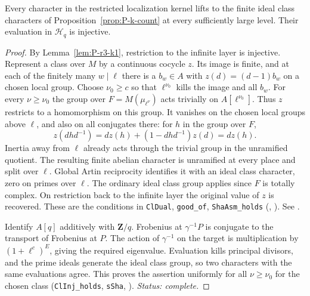 \begin{lemma}\label{lem:P-r3-k6}
Every character in the restricted localization kernel lifts to the
finite ideal class characters of Proposition~\ref{prop:P-k-count}
at every sufficiently large level. Their evaluation in $\mathcal H_q$
is injective.
\end{lemma}
\begin{proof}
By Lemma~\ref{lem:P-r3-k1}, restriction to the infinite layer is
injective. Represent a class over $M$ by a continuous cocycle $z$.
Its image is finite, and at each of the finitely many $w\mid\ell$
there is a $b_w\in A$ with $z(d)=(d-1)b_w$ on a chosen local group.
Choose $\nu_0\ge c$ so that $\ell^{\nu_0}$ kills the image and all
$b_w$. For every $\nu\ge\nu_0$ the group over $F=M(\mu_{\ell^\nu})$
acts trivially on $A[\ell^{\nu_0}]$. Thus $z$ restricts to a homomorphism
on this group. It vanishes on the chosen local groups above $\ell$,
and also on all conjugates there: for $h$ in the group over $F$,
\[
 z(dhd^{-1})=d z(h)+(1-dhd^{-1})z(d)=d z(h).
\]
Inertia away from $\ell$ already acts through the trivial group in the
unramified quotient. The resulting finite abelian character is unramified
at every place and split over $\ell$. Global Artin reciprocity identifies
it with an ideal class character, zero on primes over $\ell$. The
ordinary ideal class group applies since $F$ is totally complex. On
restriction back to the infinite layer the original value of $z$ is
recovered. These are the conditions in \nolinkurl{ClDual},
\nolinkurl{good_of}, \nolinkurl{ShaAsm_holds}
(,
).
See \cite[Theorem 0.4 and the Artin map in Chapter V]{P-R3-CFT}.

Identify $A[q]$ additively with $\mathbf Z/q$. Frobenius at
$\gamma^{-1}P$ is conjugate to the transport of Frobenius at $P$.
The action of $\gamma^{-1}$ on the target is multiplication by
$(1+\ell^c)^E$, giving the required eigenvalue. Evaluation kills
principal divisors, and the prime ideals generate the ideal class
group, so two characters with the same evaluations agree. This proves
the assertion uniformly for all $\nu\ge\nu_0$ for the chosen class
(\nolinkurl{ClInj_holds}, \nolinkurl{sSha},
).
\emph{Status: complete.}
\end{proof}

